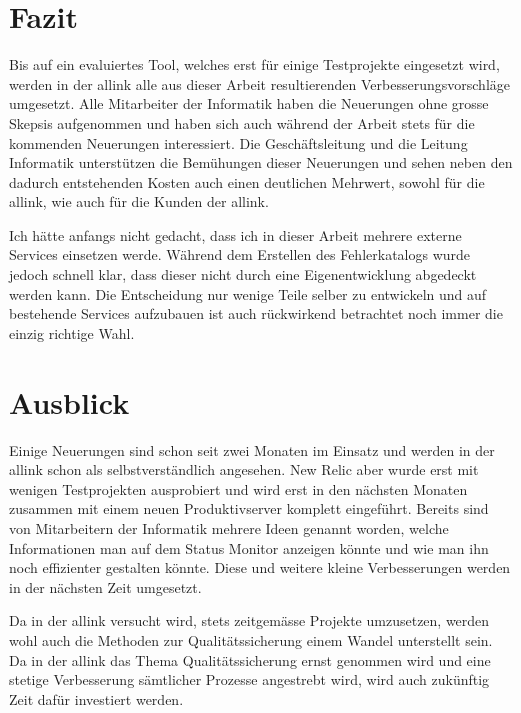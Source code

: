 
\section{Fazit}
\label{sec:fazit}
Bis auf ein evaluiertes Tool, welches erst für einige Testprojekte eingesetzt wird, werden in der allink alle aus dieser Arbeit resultierenden Verbesserungsvorschläge umgesetzt. Alle Mitarbeiter der Informatik haben die Neuerungen ohne grosse Skepsis aufgenommen und haben sich auch während der Arbeit stets für die kommenden Neuerungen interessiert. Die Geschäftsleitung und die Leitung Informatik unterstützen die Bemühungen dieser Neuerungen und sehen neben den dadurch entstehenden Kosten auch einen deutlichen Mehrwert, sowohl für die allink, wie auch für die Kunden der allink.

Ich hätte anfangs nicht gedacht, dass ich in dieser Arbeit mehrere externe Services einsetzen werde. Während dem Erstellen des Fehlerkatalogs wurde jedoch schnell klar, dass dieser nicht durch eine Eigenentwicklung abgedeckt werden kann. Die Entscheidung nur wenige Teile selber zu entwickeln und auf bestehende Services aufzubauen ist auch rückwirkend betrachtet noch immer die einzig richtige Wahl.

\section{Ausblick}
\label{sec:ausblick}
Einige Neuerungen sind schon seit zwei Monaten im Einsatz und werden in der allink schon als selbstverständlich angesehen. New Relic aber wurde erst mit wenigen Testprojekten ausprobiert und wird erst in den nächsten Monaten zusammen mit einem neuen Produktivserver komplett eingeführt. Bereits sind von Mitarbeitern der Informatik mehrere Ideen genannt worden, welche Informationen man auf dem Status Monitor anzeigen könnte und wie man ihn noch effizienter gestalten könnte. Diese und weitere kleine Verbesserungen werden in der nächsten Zeit umgesetzt.

Da in der allink versucht wird, stets zeitgemässe Projekte umzusetzen, werden wohl auch die Methoden zur Qualitätssicherung einem Wandel unterstellt sein. Da in der allink das Thema Qualitätssicherung ernst genommen wird und eine stetige Verbesserung sämtlicher Prozesse angestrebt wird, wird auch zukünftig Zeit dafür investiert werden.

